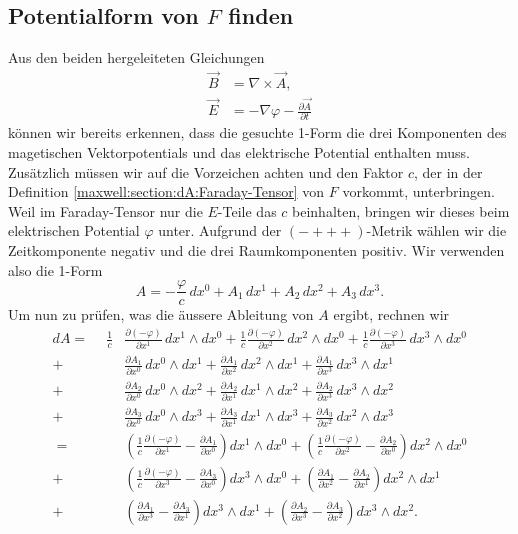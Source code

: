 \subsection{Potentialform von $F$ finden}
Aus den beiden hergeleiteten Gleichungen
\begin{align*}
	\vec{B} &= \nabla \times \vec{A},\\
	\vec{E} &= -\nabla \varphi -\frac{\partial \vec{A}}{\partial t}
\end{align*}
können wir bereits erkennen, dass die gesuchte 1-Form die drei Komponenten des magetischen Vektorpotentials und das elektrische Potential enthalten muss.
Zusätzlich müssen wir auf die Vorzeichen achten und den Faktor $c$, der in der Definition \eqref{maxwell:section:dA:Faraday-Tensor} von $F$ vorkommt, unterbringen.
Weil im Faraday-Tensor nur die $E$-Teile das $c$ beinhalten, bringen wir dieses beim elektrischen Potential $\varphi$ unter.
Aufgrund der $({-}{+}{+}{+})$-Metrik wählen wir die Zeitkomponente negativ und die drei Raumkomponenten positiv.
Wir verwenden also die 1-Form 
\begin{equation}
	A = -\frac{\varphi}{c}\,dx^0 + A_1 \,dx^1 + A_2 \,dx^2 + A_3 \,dx^3.
\end{equation}
Um nun zu prüfen, was die äussere Ableitung von $A$ ergibt, rechnen wir
\begin{align*}
	dA = \phantom{+}
	 \frac{1}{c} &\frac{\partial (-\varphi)}{\partial x^1} \,dx^1 \wedge dx^0
	+ \frac{1}{c}\frac{\partial (-\varphi)}{\partial x^2} \,dx^2 \wedge dx^0
	+ \frac{1}{c}\frac{\partial (-\varphi)}{\partial x^3} \,dx^3 \wedge dx^0
	\\
	+ \phantom{\frac{1}{c}} &\frac{\partial A_1}{\partial x^0} \,dx^0 \wedge dx^1
	+ \frac{\partial A_1}{\partial x^2} \,dx^2 \wedge dx^1
	+ \frac{\partial A_1}{\partial x^3} \,dx^3 \wedge dx^1
	\\
	+ \phantom{\frac{1}{c}} &\frac{\partial A_2}{\partial x^0} \,dx^0 \wedge dx^2
	+ \frac{\partial A_2}{\partial x^1} \,dx^1 \wedge dx^2
	+ \frac{\partial A_2}{\partial x^3} \,dx^3 \wedge dx^2
	\\
	+ \phantom{\frac{1}{c}} &\frac{\partial A_3}{\partial x^0} \,dx^0 \wedge dx^3
	+ \frac{\partial A_3}{\partial x^1} \,dx^1 \wedge dx^3
	+ \frac{\partial A_3}{\partial x^2} \,dx^2 \wedge dx^3
	\\[2ex] 
	=
	\phantom{+} & \left(\frac{1}{c}\frac{\partial (-\varphi)}{\partial x^1}-\frac{\partial A_1}{\partial x^0}\right) dx^1 \wedge dx^0 
	+ \left(\frac{1}{c}\frac{\partial (-\varphi)}{\partial x^2}-\frac{\partial A_2}{\partial x^0}\right) dx^2 \wedge dx^0
	\\
	+ &\left(\frac{1}{c}\frac{\partial (-\varphi)}{\partial x^3}-\frac{\partial A_3}{\partial x^0}\right) dx^3 \wedge dx^0
	+ \left(\frac{\partial A_1}{\partial x^2}-\frac{\partial A_2}{\partial x^1}\right) dx^2 \wedge dx^1
	\\
	+ & \left(\frac{\partial A_1}{\partial x^3}-\frac{\partial A_3}{\partial x^1}\right) dx^3 \wedge dx^1 
	+ \left(\frac{\partial A_2}{\partial x^3}-\frac{\partial A_3}{\partial x^2}\right) dx^3 \wedge dx^2.				
\end{align*}
